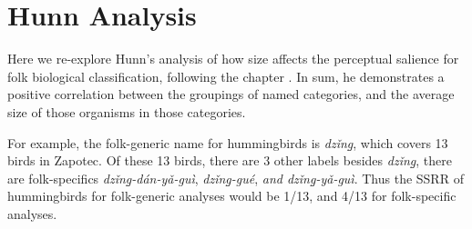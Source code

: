 \documentclass[10pt,letterpaper]{article}
\begin{document}
\section{Hunn Analysis}
Here we re-explore Hunn's analysis of how size affects the perceptual salience for folk biological classification, following the chapter \cite{hunn1999size}. In sum, he demonstrates a positive correlation between the groupings of named categories, and the average size of those organisms in those categories.


For example, the folk-generic name for hummingbirds is \textit{dz\v{i}n\b{g}}, which covers 13 birds in Zapotec. Of these 13 birds, there are 3 other labels besides \textit{dz\v{i}n\b{g}}, there are folk-specifics \textit{dz\v{i}n\b{g}-d\'{a}n-y\v{a}-gu\`{i}}, \textit{dz\v{i}n\b{g}-gu\'{e}}, \textit{and dz\v{i}n\b{g}-y\v{a}-gu\`{i}}. Thus the SSRR of hummingbirds for folk-generic analyses would be 1/13, and 4/13 for folk-specific analyses.
\end{document}
